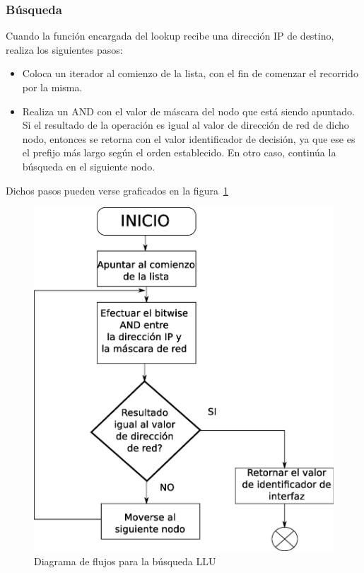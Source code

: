 \subsubsection{Búsqueda}

Cuando la función encargada del lookup recibe una dirección IP de destino, realiza los siguientes pasos:

\begin{itemize}
	\item Coloca un iterador al comienzo de la lista, con el fin de comenzar el recorrido por la misma.
	\item Realiza un AND con el valor de máscara del nodo que está siendo apuntado. Si el resultado de la operación es igual al valor de dirección de red de dicho nodo, entonces se retorna con el valor identificador de decisión, ya que ese es el prefijo más largo según el orden establecido. En otro caso, continúa la búsqueda en el siguiente nodo.
\end{itemize}

Dichos pasos pueden verse graficados en la figura~\ref{fig:llusearch}

\begin{figure}[H]
  \centering
	\includegraphics[scale=0.50]{4-implementacion/graf/llusearch.eps}
  \caption{Diagrama de flujos para la búsqueda LLU}
  \label{fig:llusearch}
\end{figure}

